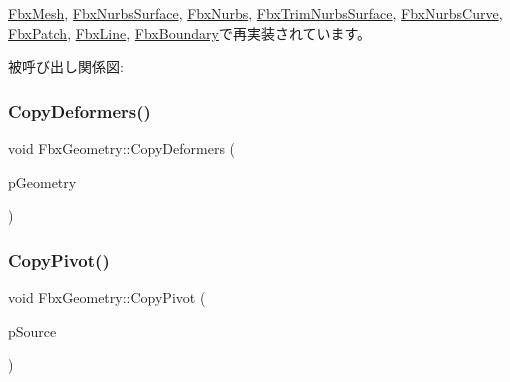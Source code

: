 \hyperlink{class_fbx_mesh_a0f041743536ee5ccbc9a086e3ef1c663}{Fbx\+Mesh}, \hyperlink{class_fbx_nurbs_surface_a1da47f75af4920a3fb4a94690d8ada8c}{Fbx\+Nurbs\+Surface}, \hyperlink{class_fbx_nurbs_ac7c9a9018b4fdbe72b258a2fa0a3367d}{Fbx\+Nurbs}, \hyperlink{class_fbx_trim_nurbs_surface_a4407d30e83346ab3cb30ccf67d7bb289}{Fbx\+Trim\+Nurbs\+Surface}, \hyperlink{class_fbx_nurbs_curve_ad48046242c0a63d929b5440563668f79}{Fbx\+Nurbs\+Curve}, \hyperlink{class_fbx_patch_a424542a42ec75d3c5236cc366adecd89}{Fbx\+Patch}, \hyperlink{class_fbx_line_aeb9e0c53cf02d3e4e206b25c87c06256}{Fbx\+Line}, \hyperlink{class_fbx_boundary_a6fe59f45c17eeebbabaeff235058ac70}{Fbx\+Boundary}で再実装されています。

被呼び出し関係図\+:
\mbox{\label{class_fbx_geometry_a0fa8343b20fb5a9c0b0bc15a83967972}} 
\subsubsection{\texorpdfstring{Copy\+Deformers()}{CopyDeformers()}}
{\footnotesize\ttfamily void Fbx\+Geometry\+::\+Copy\+Deformers (\begin{DoxyParamCaption}\item[{const \hyperlink{class_fbx_geometry}{Fbx\+Geometry} $\ast$}]{p\+Geometry }\end{DoxyParamCaption})\hspace{0.3cm}{\ttfamily [protected]}}

\mbox{\label{class_fbx_geometry_a97edd8b50b825e220a2c246936480160}} 
\subsubsection{\texorpdfstring{Copy\+Pivot()}{CopyPivot()}}
{\footnotesize\ttfamily void Fbx\+Geometry\+::\+Copy\+Pivot (\begin{DoxyParamCaption}\item[{const \hyperlink{class_fbx_geometry}{Fbx\+Geometry} $\ast$}]{p\+Source }\end{DoxyParamCaption})\hspace{0.3cm}{\ttfamily [protected]}}

